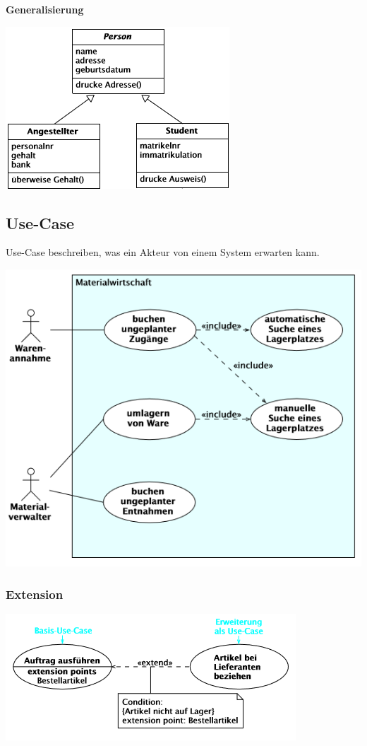 \textbf{Generalisierung}\\
\begin{center}
	\includegraphics[width=0.5\columnwidth]{Images/generalisierung}
\end{center}


\subsection{Use-Case}
Use-Case beschreiben, was ein Akteur von einem System erwarten kann. 
\begin{center}
	\includegraphics[width=\columnwidth]{Images/usecase}
\end{center}

\subsubsection{Extension}
\includegraphics[width=\columnwidth]{Images/extension}

